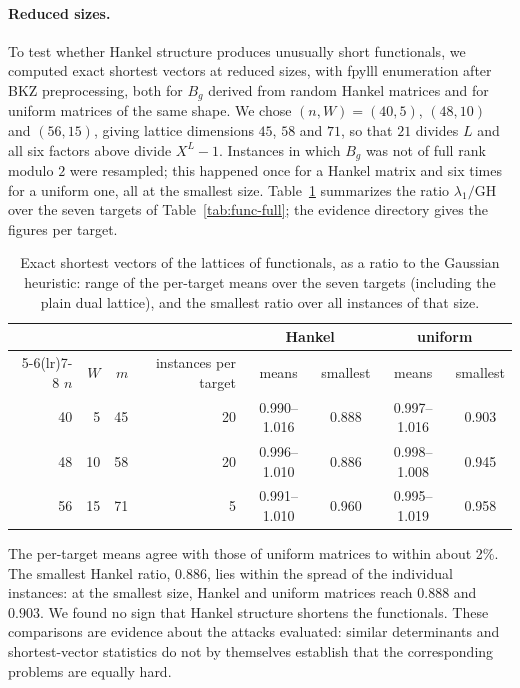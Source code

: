 \documentclass[11pt,a4paper]{article}
\theoremstyle{definition}
\begin{document}
\paragraph{Reduced sizes.} To test whether Hankel structure produces unusually short functionals, we computed exact shortest vectors at reduced sizes, with fpylll enumeration after BKZ preprocessing, both for $B_g$ derived from random Hankel matrices and for uniform matrices of the same shape. We chose $(n, W) = (40, 5)$, $(48, 10)$ and $(56, 15)$, giving lattice dimensions $45$, $58$ and $71$, so that $21$ divides $L$ and all six factors above divide $X^L - 1$. Instances in which $B_g$ was not of full rank modulo $2$ were resampled; this happened once for a Hankel matrix and six times for a uniform one, all at the smallest size. Table~\ref{tab:func-small} summarizes the ratio $\lambda_1 / \mathrm{GH}$ over the seven targets of Table~\ref{tab:func-full}; the evidence directory gives the figures per target.

\begin{table}[H]
\centering
\small
\begin{tabular}{rrr r cc cc}
\toprule
& & & & \multicolumn{2}{c}{Hankel} & \multicolumn{2}{c}{uniform} \\
\cmidrule(lr){5-6}\cmidrule(lr){7-8}
$n$ & $W$ & $m$ & instances per target & means & smallest & means & smallest \\
\midrule
40 & 5 & 45 & 20 & 0.990--1.016 & 0.888 & 0.997--1.016 & 0.903 \\
48 & 10 & 58 & 20 & 0.996--1.010 & 0.886 & 0.998--1.008 & 0.945 \\
56 & 15 & 71 & 5 & 0.991--1.010 & 0.960 & 0.995--1.019 & 0.958 \\
\bottomrule
\end{tabular}
\caption{Exact shortest vectors of the lattices of functionals, as a ratio to the Gaussian heuristic: range of the per-target means over the seven targets (including the plain dual lattice), and the smallest ratio over all instances of that size.}
\label{tab:func-small}
\end{table}

The per-target means agree with those of uniform matrices to within about 2\%. The smallest Hankel ratio, $0.886$, lies within the spread of the individual instances: at the smallest size, Hankel and uniform matrices reach $0.888$ and $0.903$. We found no sign that Hankel structure shortens the functionals. These comparisons are evidence about the attacks evaluated: similar determinants and shortest-vector statistics do not by themselves establish that the corresponding problems are equally hard.
\end{document}
